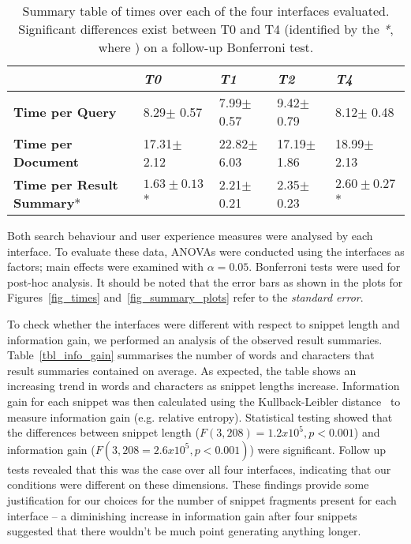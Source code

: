 \begin{table*}[t]
    \caption{Summary table of times over each of the four interfaces evaluated. Significant differences exist between T0 and T4 (identified by the \emph{*}, where ) on a follow-up Bonferroni test.\vspace{-3mm}}
    \label{tbl_times}
    \renewcommand{\arraystretch}{1.4}
    \begin{center}
    \begin{tabulary}{\textwidth}{L{6.3cm}||D{2.4cm}|D{2.4cm}|D{2.4cm}|D{2.4cm}}
    \hline
    & \textbf{\emph{T0}} & \textbf{\emph{T1}} & \textbf{\emph{T2}} & \textbf{\emph{T4}}  \\ \hline\hline

    \textbf{Time per Query} 	& 8.29$\pm$ 0.57 	& 7.99$\pm$ 0.57 	& 9.42$\pm$ 0.79 	& 8.12$\pm$ 0.48 \\ \hline
    \textbf{Time per Document}		& 17.31$\pm$ 2.12 	& 22.82$\pm$ 6.03 	& 17.19$\pm$ 1.86 	& 18.99$\pm$ 2.13 \\ \hline
    \textbf{Time per Result Summary}* 	& $1.63\pm0.13$* 	& 2.21$\pm$ 0.21 	& 2.35$\pm$ 0.23 	& $2.60\pm0.27$*  \\ \hline

    \end{tabulary}
    \end{center}
    \vspace{-2mm}
\end{table*}

Both search behaviour and user experience measures were analysed by each interface. To evaluate these data, ANOVAs were conducted using the interfaces as factors; main effects were examined with $\alpha=0.05$. Bonferroni tests were used for post-hoc analysis. It should be noted that the error bars as shown in the plots for Figures~\ref{fig_times} and~\ref{fig_summary_plots} refer to the \emph{standard error}.

To check whether the interfaces were different with respect to snippet length and information gain, we performed an analysis of the observed result summaries. Table~\ref{tbl_info_gain} summarises the number of words and characters that result summaries contained on average. As expected, the table shows an increasing trend in words and characters as snippet lengths increase. Information gain for each snippet was then calculated using the Kullback-Leibler distance~\cite{kullback1951information} to measure information gain (e.g. relative entropy). Statistical testing showed that the differences between snippet length ($F(3,208)=1.2x10^5, p<0.001$) and information gain ($F(3,208=2.6x10^5, p<0.001)$) were significant. Follow up tests revealed that this was the case over all four interfaces, indicating that our conditions were different on these dimensions. These findings provide some justification for our choices for the number of snippet fragments present for each interface -- a diminishing increase in information gain after four snippets suggested that there wouldn't be much point generating anything longer.

